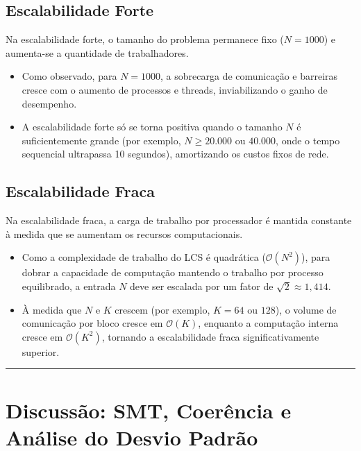\documentclass[12pt,a4paper]{article}
\begin{document}
\subsection*{Escalabilidade Forte}
Na escalabilidade forte, o tamanho do problema permanece fixo ($N = 1000$) e aumenta-se a quantidade de trabalhadores. 
\begin{itemize}
    \item Como observado, para $N = 1000$, a sobrecarga de comunicação e barreiras cresce com o aumento de processos e threads, inviabilizando o ganho de desempenho.
    \item A escalabilidade forte só se torna positiva quando o tamanho $N$ é suficientemente grande (por exemplo, $N \ge 20.000$ ou $40.000$, onde o tempo sequencial ultrapassa 10 segundos), amortizando os custos fixos de rede.
\end{itemize}

\subsection*{Escalabilidade Fraca}
Na escalabilidade fraca, a carga de trabalho por processador é mantida constante à medida que se aumentam os recursos computacionais.
\begin{itemize}
    \item Como a complexidade de trabalho do LCS é quadrática ($\mathcal{O}(N^2)$), para dobrar a capacidade de computação mantendo o trabalho por processo equilibrado, a entrada $N$ deve ser escalada por um fator de $\sqrt{2} \approx 1{,}414$.
    \item À medida que $N$ e $K$ crescem (por exemplo, $K = 64$ ou $128$), o volume de comunicação por bloco cresce em $\mathcal{O}(K)$, enquanto a computação interna cresce em $\mathcal{O}(K^2)$, tornando a escalabilidade fraca significativamente superior.
\end{itemize}

\vspace{0.5cm}
\hrule
\vspace{0.5cm}

\section{Discussão: SMT, Coerência e Análise do Desvio Padrão}
\end{document}
